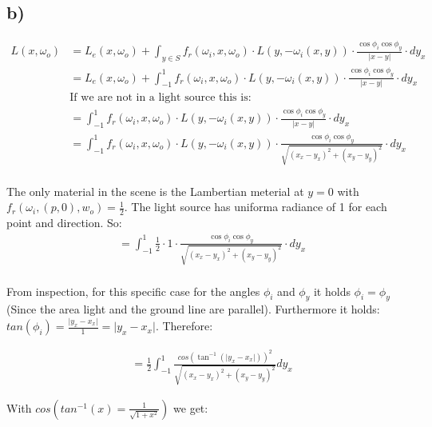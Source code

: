 \documentclass[a4paper]{scrartcl}
\begin{document}
\subsection*{b)}

\begin{align*}
  L(x, \omega_o) &= L_e(x, \omega_o) + \int_{y \in S} f_r(\omega_i, x, \omega_o) \cdot L(y, -\omega_i(x,y)) \cdot \frac{\cos \phi_i \cos \phi_y}{\lvert x - y \rvert} \cdot d y_x \\
  &= L_e(x, \omega_o) + \int_{-1}^{1} f_r(\omega_i, x, \omega_o) \cdot L(y, -\omega_i(x,y)) \cdot \frac{\cos \phi_i \cos \phi_y}{\lvert x - y \rvert} \cdot d y_x \\
  & \text{If we are not in a light source this is: } \\
  &= \int_{-1}^{1} f_r(\omega_i, x, \omega_o) \cdot L(y, -\omega_i(x,y)) \cdot \frac{\cos \phi_i \cos \phi_y}{\lvert x - y \rvert} \cdot d y_x \\
  &= \int_{-1}^{1} f_r(\omega_i, x, \omega_o) \cdot L(y, -\omega_i(x,y)) \cdot \frac{\cos \phi_i \cos \phi_y}{\sqrt{(x_x - y_x)^2 + (x_y - y_y)^2}} \cdot d y_x \\
\end{align*}

The only material in the scene is the Lambertian meterial at $y=0$ with $f_r(\omega_i, (p,0), w_o) = \frac{1}{2}$. The light source has uniforma radiance of 1 for each point and direction. So:
\begin{align*}
  &= \int_{-1}^{1} \frac{1}{2} \cdot 1 \cdot \frac{\cos \phi_i \cos \phi_y}{\sqrt{(x_x - y_x)^2 + (x_y - y_y)^2}} \cdot d y_x \\
\end{align*}

From inspection, for this specific case for the angles $\phi_i$ and $\phi_y$ it holds $\phi_i = \phi_y$ (Since the area light and the ground line are parallel). 
Furthermore it holds: $tan(\phi_i) = \frac{\lvert y_x - x_x \rvert}{1} = \lvert y_x - x_x \rvert$. Therefore:

\begin{align*}
  &= \frac{1}{2} \int_{-1}^{1} \frac{cos(\tan^{-1}(\lvert y_x - x_x \rvert))^2}{\sqrt{(x_x - y_x)^2 + (x_y - y_y)^2}} d y_x
\end{align*}

With $cos(tan^{-1}(x) = \frac{1}{\sqrt{1 + x^2}})$ we get:
\end{document}
